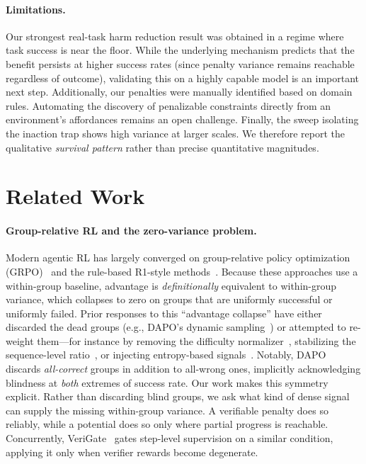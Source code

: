 \paragraph{Limitations.} Our strongest real-task harm reduction result was obtained in a regime where task success is near the floor. While the underlying mechanism predicts that the benefit persists at higher success rates (since penalty variance remains reachable regardless of outcome), validating this on a highly capable model is an important next step. Additionally, our penalties were manually identified based on domain rules. Automating the discovery of penalizable constraints directly from an environment's affordances remains an open challenge. Finally, the sweep isolating the inaction trap shows high variance at larger scales. We therefore report the qualitative \emph{survival pattern} rather than precise quantitative magnitudes.

\section{Related Work}

\paragraph{Group-relative RL and the zero-variance problem.} Modern agentic RL has largely converged on group-relative policy optimization (GRPO)~\citep{deepseekmath} and the rule-based R1-style methods~\citep{deepseekr1,tulu3}. Because these approaches use a within-group baseline, advantage is \emph{definitionally} equivalent to within-group variance, which collapses to zero on groups that are uniformly successful or uniformly failed. Prior responses to this ``advantage collapse'' have either discarded the dead groups (e.g., DAPO's dynamic sampling~\citep{dapo}) or attempted to re-weight them---for instance by removing the difficulty normalizer~\citep{drgrpo}, stabilizing the sequence-level ratio~\citep{gspo}, or injecting entropy-based signals~\citep{rlzvp}. Notably, DAPO discards \emph{all-correct} groups in addition to all-wrong ones, implicitly acknowledging blindness at \emph{both} extremes of success rate. Our work makes this symmetry explicit. Rather than discarding blind groups, we ask what kind of dense signal can supply the missing within-group variance. A verifiable penalty does so reliably, while a potential does so only where partial progress is reachable. Concurrently, VeriGate~\citep{verigate} gates step-level supervision on a similar condition, applying it only when verifier rewards become degenerate.

